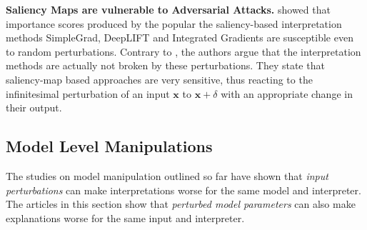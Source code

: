 \documentclass[sigconf]{acmart}
\newcommand{\mypar}[1]{\vspace{0.2cm}\noindent\textbf{#1}}
\begin{document}
\mypar{Saliency Maps are vulnerable to Adversarial Attacks.}
\cite{ghorbani2019interpretation} showed that importance scores produced by the popular the saliency-based interpretation methods SimpleGrad, DeepLIFT and Integrated Gradients are susceptible even to random perturbations. Contrary to \cite{dombrowski2019explanations}, the authors argue that the interpretation methods are actually not broken by these perturbations. They state that saliency-map based approaches are very sensitive, thus reacting to the infinitesimal perturbation of an input $\mathbf{x}$ to $\mathbf{x}+\delta$ with an appropriate change in their output.

\subsection{Model Level Manipulations}
The studies on model manipulation outlined so far have shown that \textit{input perturbations} can make interpretations worse for the same model and interpreter. The articles in this section show that \textit{perturbed model parameters} can also make explanations worse for the same input and interpreter.
\end{document}
